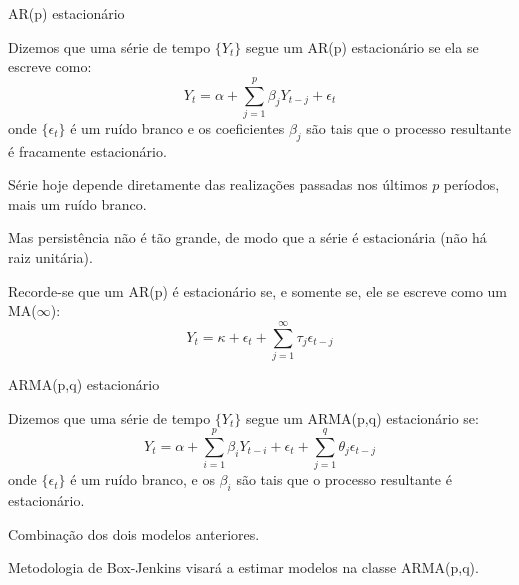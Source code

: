 \documentclass[11pt]{beamer}
\newenvironment{halfwideitemize}{\itemize\addtolength{\itemsep}{0.5em}}{\enditemize}
\begin{document}
\begin{frame}{AR(p) estacionário}
	\begin{halfwideitemize}
		\item Dizemos que uma série de tempo $\{Y_t\}$ segue um AR(p) estacionário se ela se escreve como:
		\begin{equation*}
			Y_t =\alpha + \sum_{j=1}^p \beta_j Y_{t-j} + \epsilon_t
		\end{equation*} 
		onde $\{\epsilon_t\}$ é um ruído branco e os coeficientes $\beta_j$ são tais que o processo resultante é fracamente estacionário.
		\item Série hoje depende diretamente das realizações passadas nos últimos $p$ períodos, mais um ruído branco.
		\begin{halfwideitemize}
			\item Mas persistência não é tão grande, de modo que a série é estacionária (não há raiz unitária).
		\end{halfwideitemize}
		\item Recorde-se que um AR(p) é estacionário se, e somente se, ele se escreve como um MA($\infty$):
		\begin{equation*}
			Y_t = \kappa + \epsilon_{t} +\sum_{j=1}^\infty \tau_j \epsilon_{t-j} 
		\end{equation*}
	\end{halfwideitemize}
\end{frame}



\begin{frame}{ARMA(p,q) estacionário}
	\begin{halfwideitemize}
		\item Dizemos que uma série de tempo $\{Y_t\}$ segue um ARMA(p,q) estacionário se:
		\begin{equation*}
			Y_t =\alpha + \sum_{i=1}^p \beta_i Y_{t-i} + \epsilon_t + \sum_{j=1}^q \theta_j \epsilon_{t-j} 
		\end{equation*} 
		onde $\{\epsilon_t\}$ é um ruído branco, e os $\beta_i$ são tais que o processo resultante é estacionário.
		\item Combinação dos dois modelos anteriores.
		\item {\color{blue} Metodologia de Box-Jenkins visará a estimar modelos na classe ARMA(p,q).}
	\end{halfwideitemize}
\end{frame}
\end{document}
